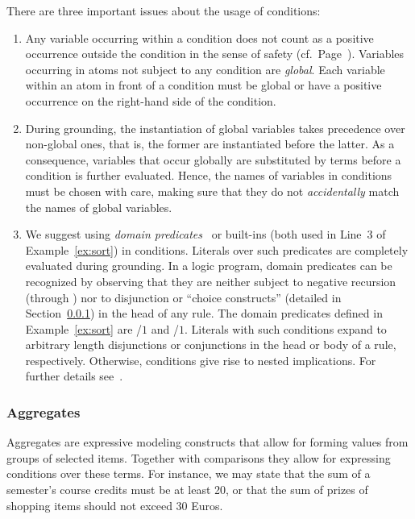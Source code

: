 \begin{note}\label{note:domain}
There are three important issues about the usage of conditions:
\begin{enumerate}
%
\item
Any variable occurring within a condition
does not count as a positive occurrence outside the condition
in the sense of safety (cf.\ Page~\pageref{pg:safe}).
Variables occurring in atoms not subject to any condition are \emph{global}.
Each variable within an atom in front of a condition
must be global or have a positive occurrence on the right-hand side of
the condition.
%
\item
During grounding,
the instantiation of global variables takes precedence over non-global ones,
that is, the former are instantiated before the latter.
As a consequence, variables that occur globally are substituted by terms
before a condition is further evaluated.
Hence, the names of variables in conditions must be chosen with care,
making sure that they do not \emph{accidentally} match the names of global variables.
%
\item
We suggest using \emph{domain predicates}~\cite{lparseManual}
or built-ins (both used in Line~3  of Example~\ref{ex:sort})
in conditions.
%
%
\label{pg:domain}%
Literals over such predicates are completely evaluated during grounding.
In a logic program, domain predicates can be recognized by observing
that they are neither subject to negative recursion (through )
nor to disjunction or ``choice constructs'' (detailed in Section~\ref{subsec:gringo:aggregate})
in the head of any rule.
The domain predicates defined in Example~\ref{ex:sort} are
/$1$ and /$1$.
Literals with such conditions expand to arbitrary length disjunctions or conjunctions in the head or body of a rule, respectively.
Otherwise, conditions give rise to nested implications.
For further details see~\cite{haliya14a}.
\end{enumerate}
\end{note}

\subsubsection{Aggregates}\label{subsec:gringo:aggregate}

Aggregates are expressive modeling constructs that allow for forming values from groups of selected items.
Together with comparisons they allow for expressing conditions over these terms.
For instance, we may state that the sum of a semester's course credits must be at least 20,
or that the sum of prizes of shopping items should not exceed 30 Euros.

